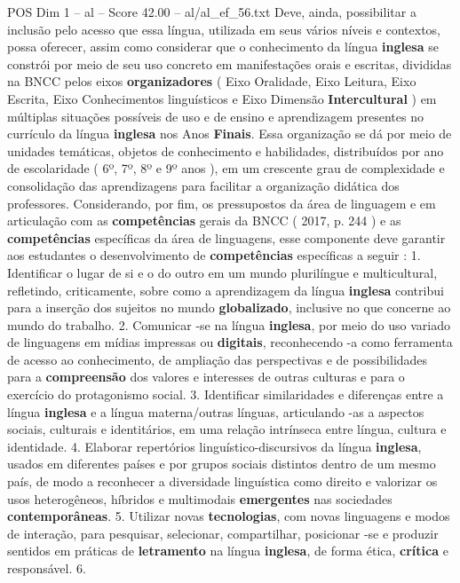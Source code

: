 \begin{textsample}{POS Dim 1 – al – Score 42.00 – al/al\_ef\_56.txt}
Deve, ainda, possibilitar a inclusão pelo acesso que essa língua, utilizada em seus vários níveis e contextos, possa oferecer, assim como considerar que o conhecimento da língua \textbf{inglesa} se constrói por meio de seu uso concreto em manifestações orais e escritas, divididas na BNCC pelos eixos \textbf{organizadores} ( Eixo Oralidade, Eixo Leitura, Eixo Escrita, Eixo Conhecimentos linguísticos e Eixo Dimensão \textbf{Intercultural} ) em múltiplas situações possíveis de uso e de ensino e aprendizagem presentes no currículo da língua \textbf{inglesa} nos Anos \textbf{Finais}.
Essa organização se dá por meio de unidades temáticas, objetos de conhecimento e habilidades, distribuídos por ano de escolaridade ( 6º, 7º, 8º e 9º anos ), em um crescente grau de complexidade e consolidação das aprendizagens para facilitar a organização didática dos professores.
Considerando, por fim, os pressupostos da área de linguagem e em articulação com as \textbf{competências} gerais da BNCC ( 2017, p. 244 ) e as \textbf{competências} específicas da área de linguagens, esse componente deve garantir aos estudantes o desenvolvimento de \textbf{competências} específicas a seguir : 1.
Identificar o lugar de si e o do outro em um mundo plurilíngue e multicultural, refletindo, criticamente, sobre como a aprendizagem da língua \textbf{inglesa} contribui para a inserção dos sujeitos no mundo \textbf{globalizado}, inclusive no que concerne ao mundo do trabalho. 2.
Comunicar -se na língua \textbf{inglesa}, por meio do uso variado de linguagens em mídias impressas ou \textbf{digitais}, reconhecendo -a como ferramenta de acesso ao conhecimento, de ampliação das perspectivas e de possibilidades para a \textbf{compreensão} dos valores e interesses de outras culturas e para o exercício do protagonismo social. 3.
Identificar similaridades e diferenças entre a língua \textbf{inglesa} e a língua materna/outras línguas, articulando -as a aspectos sociais, culturais e identitários, em uma relação intrínseca entre língua, cultura e identidade. 4.
Elaborar repertórios linguístico-discursivos da língua \textbf{inglesa}, usados em diferentes países e por grupos sociais distintos dentro de um mesmo país, de modo a reconhecer a diversidade linguística como direito e valorizar os usos heterogêneos, híbridos e multimodais \textbf{emergentes} nas sociedades \textbf{contemporâneas}. 5.
Utilizar novas \textbf{tecnologias}, com novas linguagens e modos de interação, para pesquisar, selecionar, compartilhar, posicionar -se e produzir sentidos em práticas de \textbf{letramento} na língua \textbf{inglesa}, de forma ética, \textbf{crítica} e responsável. 6.

\end{textsample}
